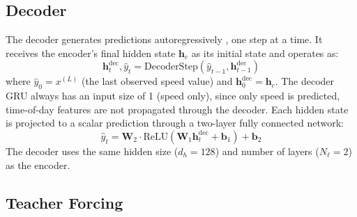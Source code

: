\subsection{Decoder}
The decoder generates predictions autoregressively \cite{cho2014}, one step at a time. It receives the encoder's final hidden state $\mathbf{h}_c$ as its initial state and operates as:
\begin{equation}
\mathbf{h}_t^{\text{dec}}, \hat{y}_t = \text{DecoderStep}(\hat{y}_{t-1}, \mathbf{h}_{t-1}^{\text{dec}})
\end{equation}
where $\hat{y}_0 = x^{(L)}$ (the last observed speed value) and $\mathbf{h}_0^{\text{dec}} = \mathbf{h}_c$. The decoder GRU always has an input size of 1 (speed only), since only speed is predicted, time-of-day features are not propagated through the decoder. Each hidden state is projected to a scalar prediction through a two-layer fully connected network:
\begin{equation}
\hat{y}_t = \mathbf{W}_2 \cdot \text{ReLU}(\mathbf{W}_1 \mathbf{h}_t^{\text{dec}} + \mathbf{b}_1) + \mathbf{b}_2
\end{equation}
The decoder uses the same hidden size ($d_h = 128$) and number of layers ($N_\ell = 2$) as the encoder.

\subsection{Teacher Forcing}


